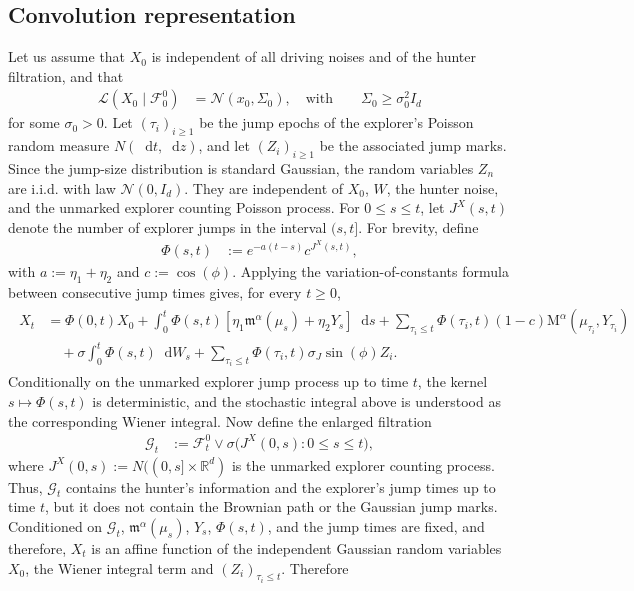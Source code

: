 \documentclass{article}
\def\m{\mathfrak{m}}
\newcommand*\der{\mathop{}\!\mathrm{d}}
\numberwithin{equation}{section}
\begin{document}
\subsection{Convolution representation}\label{subsec2.2_conv_rep}

Let us assume that $X_0$ is independent of all driving noises and of the hunter filtration, and that
\begin{align}
\mathcal L(X_0\mid \mathcal F_0^0) &= \mathcal N(x_0,\Sigma_0), \quad \text{with} \qquad \Sigma_0\geq\sigma_0^2I_d
\end{align}
for some $\sigma_0>0$. Let $(\tau_i)_{i\geq1}$ be the jump epochs of the explorer's Poisson random measure $N(\der t,\der z)$, and let $(Z_i)_{i\geq1}$ be the associated jump marks. Since the jump-size distribution is standard Gaussian, the random variables $Z_n$ are i.i.d. with law $\mathcal N(0,I_d)$. They are independent of $X_0$, $W$, the hunter noise, and the unmarked explorer counting Poisson process. For $0\leq s\leq t$, let $J^X(s,t)$ denote the number of explorer jumps in the interval $(s,t]$. For brevity, define
\begin{align}
\Phi(s,t) &:= e^{-a(t-s)}c^{J^X(s,t)},
\end{align}
with $a := \eta_1 + \eta_2$ and $c := \cos(\phi)$. Applying the variation-of-constants formula between consecutive jump times gives, for every $t\geq0$,
\begin{align}
\begin{aligned}
X_t &= \Phi(0,t)X_0 + \int_0^t \Phi(s,t) [ \eta_1 \m^\alpha(\mu_s)+\eta_2Y_s]\der s  + \sum_{\tau_i\leq t} \Phi(\tau_i,t)(1-c) \mathrm{M}^\alpha(\mu_{\tau_i},Y_{\tau_i}) \\
&\quad + \sigma\int_0^t\Phi(s,t)\der W_s + \sum_{\tau_i\leq t}\Phi(\tau_i,t)\sigma_J \sin(\phi) Z_i .
\end{aligned}
\end{align}
Conditionally on the unmarked explorer jump process up to time $t$, the kernel $s \mapsto \Phi(s,t)$ is deterministic, and the stochastic integral above is understood as the corresponding Wiener integral. Now define the enlarged filtration
\begin{align}
\mathcal G_t &:= \mathcal{F}^0_t \vee \sigma\bigl(J^X(0,s):0\leq s\leq t\bigr),
\end{align}
where $J^X(0,s):=N((0,s]\times\mathbb R^d)$ is the unmarked explorer counting process. Thus, $\mathcal{G}_t$ contains the hunter's information and the explorer's jump times up to time $t$, but it does not contain the Brownian path or the Gaussian jump marks. Conditioned on $\mathcal G_t$, $\m^\alpha(\mu_s)$, $Y_s$, $\Phi(s,t)$, and the jump times are fixed, and therefore, $X_t$ is an affine function of the independent Gaussian random variables $X_0$, the Wiener integral term and $(Z_i)_{\tau_i\leq t}$. Therefore
\end{document}
